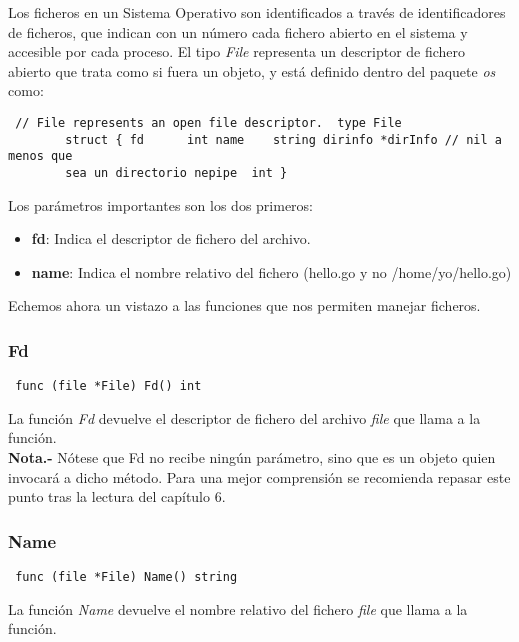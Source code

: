 		Los ficheros en un Sistema Operativo son identificados a través de
		identificadores de ficheros, que indican con un número cada fichero
		abierto en el sistema y accesible por cada proceso. El tipo
		\textit{File} representa un descriptor de fichero abierto que trata como
		si fuera un objeto, y está definido dentro del paquete \textit{os} como:
		
		\begin{verbatim} // File represents an open file descriptor.  type File
		struct { fd      int name    string dirinfo *dirInfo // nil a menos que
		sea un directorio nepipe  int } \end{verbatim}
		
		Los parámetros importantes son los dos primeros:
		
		\begin{itemize} \item \textbf{fd}: Indica el descriptor de fichero del
		archivo.  \item \textbf{name}: Indica el nombre relativo del fichero
		(hello.go y no /home/yo/hello.go) \end{itemize}
		
		Echemos ahora un vistazo a las funciones que nos permiten manejar
		ficheros.
		
		\subsubsection{Fd}

		\begin{verbatim} func (file *File) Fd() int \end{verbatim}
				
		La función \textit{Fd} devuelve el descriptor de fichero del archivo
		\textit{file} que llama a la función.\\
		
		\textbf{Nota.-} Nótese que Fd no recibe ningún parámetro, sino que es un
		objeto quien invocará a dicho método. Para una mejor comprensión se
		recomienda repasar este punto tras la lectura del capítulo 6.
		
		\subsubsection{Name}

		\begin{verbatim} func (file *File) Name() string \end{verbatim}
				
		La función \textit{Name} devuelve el nombre relativo del fichero
		\textit{file} que llama a la función.
		
